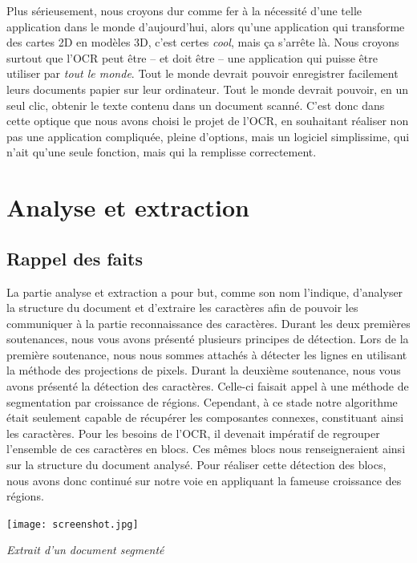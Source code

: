 \documentclass[a4paper,12pt]{report}
\begin{document}
Plus sérieusement, nous croyons dur comme fer à la nécessité d’une telle application dans le monde d’aujourd’hui, alors qu’une application qui transforme des cartes 2D en modèles 3D, c’est certes \emph{cool}, mais ça s’arrête là. Nous croyons surtout que l’OCR peut être – et doit être – une application qui puisse être utiliser par \emph{tout le monde}. Tout le monde devrait pouvoir enregistrer facilement leurs documents papier sur leur ordinateur. Tout le monde devrait pouvoir, en un seul clic, obtenir le texte contenu dans un document scanné. C’est donc dans cette optique que nous avons choisi le projet de l’OCR, en souhaitant réaliser non pas une application compliquée, pleine d’options, mais un logiciel simplissime, qui n’ait qu’une seule fonction, mais qui la remplisse correctement.

\chapter{Analyse et extraction}

\section{Rappel des faits}

La partie analyse et extraction a pour but, comme son nom l'indique, d'analyser la
structure du document et d'extraire les caractères afin de pouvoir les communiquer à la
partie reconnaissance des caractères. Durant les deux premières soutenances, nous vous
avons présenté plusieurs principes de détection. Lors de la première soutenance, nous nous
sommes attachés à détecter les lignes en utilisant la méthode des projections de pixels.
Durant la deuxième soutenance, nous vous avons présenté la détection des
caractères. Celle-ci faisait appel à une méthode de segmentation par croissance de régions.
Cependant, à ce stade notre algorithme était seulement capable de récupérer les
composantes connexes, constituant ainsi les caractères. Pour les besoins de l'OCR, il
devenait impératif de regrouper l'ensemble de ces caractères en blocs. Ces mêmes blocs
nous renseigneraient ainsi sur la structure du document analysé. Pour réaliser cette
détection des blocs, nous avons donc continué sur notre voie en appliquant la fameuse
croissance des régions.

\begin{center}
  \texttt{[image: screenshot.jpg]}
  \caption{\emph{Extrait d'un document segment\'e}}
\end{center}
\end{document}
